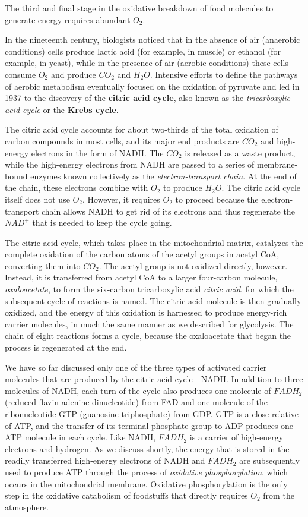 The third and final stage in the oxidative breakdown of food molecules
to generate energy requires abundant $O_2$.

In the nineteenth century, biologists noticed that in the absence of air
(anaerobic conditions) cells produce lactic acid (for example, in muscle)
or ethanol (for example, in yeast), while in the presence of air (aerobic
conditions) these cells consume $O_2$ and produce $CO_2$ and $H_{2}O$. Intensive
efforts to define the pathways of aerobic metabolism eventually focused
on the oxidation of pyruvate and led in 1937 to the discovery of the \textbf{citric
acid cycle}, also known as the \textit{tricarboxylic acid cycle} or the
\textbf{Krebs cycle}.

The citric acid cycle accounts for about
two-thirds of the total oxidation of carbon compounds in most cells, and
its major end products are $CO_2$ and high-energy electrons in the form of
NADH. The $CO_2$ is released as a waste product, while the high-energy
electrons from NADH are passed to a series of membrane-bound enzymes
known collectively as the \textit{electron-transport chain}. At the end of the chain,
these electrons combine with $O_2$ to produce $H_{2}O$. The citric acid cycle
itself does not use $O_2$. However, it requires $O_2$ to proceed because the
electron-transport chain allows NADH to get rid of its electrons and thus
regenerate the $NAD^+$ that is needed to keep the cycle going.

The citric acid cycle, which takes place in the mitochondrial matrix, catalyzes
the complete oxidation of the carbon atoms of the acetyl groups in
acetyl CoA, converting them into $CO_2$. The acetyl group is not oxidized
directly, however. Instead, it is transferred from acetyl CoA to a larger
four-carbon molecule, \textit{oxaloacetate}, to form the six-carbon tricarboxylic
acid \textit{citric acid}, for which the subsequent cycle of reactions is named.
The citric acid molecule is then gradually oxidized, and the energy of this
oxidation is harnessed to produce energy-rich carrier molecules, in much
the same manner as we described for glycolysis. The chain of eight reactions
forms a cycle, because the oxaloacetate that began the process is
regenerated at the end.

We have so far discussed only one of the three types of activated carrier
molecules that are produced by the citric acid cycle - NADH. In addition
to three molecules of NADH, each turn of the cycle also produces one
molecule of $FADH_2$ (reduced flavin adenine dinucleotide) from FAD and
one molecule of the ribonucleotide GTP (guanosine triphosphate) from
GDP. GTP is a close relative of ATP, and
the transfer of its terminal phosphate group to ADP produces one ATP
molecule in each cycle. Like NADH, $FADH_2$ is a carrier of high-energy
electrons and hydrogen. As we discuss shortly, the energy that is stored
in the readily transferred high-energy electrons of NADH and $FADH_2$ are
subsequently used to produce ATP through the process of \textit{oxidative phosphorylation},
which occurs in the mitochondrial membrane. Oxidative
phosphorylation is the only step in the oxidative catabolism of foodstuffs
that directly requires $O_2$ from the atmosphere.

